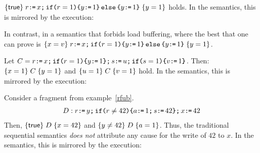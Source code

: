 $\hoare{\TRUE}{r \GETS x \SEMI \IF{r=1} \THEN y \GETS 1 \ELSE y \GETS 1 \FI}{y=1} $ holds.  
In the semantics, this is mirrored by the execution:
\begin{tikzdisplay}[node distance=1em]
\end{tikzdisplay}
In contrast, in a semantics that forbids load buffering, where the best that one can prove is
$\hoare{x=v} {r \GETS x \SEMI \IF{r=1} \THEN y \GETS 1 \ELSE y \GETS 1 \FI}{y= 1}
$.

Let $\aCmd = r \GETS x \SEMI \IF{r=1} \THEN y \GETS 1 \FI \SEMI s \GETS u \SEMI \IF{s=1} \THEN v \GETS 1 \FI$.  Then:
$ \hoare{x=1}{\aCmd}{y=1}$ and
$ \hoare{u=1}{\aCmd}{v=1}$
hold.  In the semantics, this is mirrored by the execution:
\begin{tikzdisplay}[node distance=1em]
\end{tikzdisplay}


Consider a fragment from example~\eqref{rfub}.
\begin{align*}
\bCmd:  r \GETS y \SEMI \IF{r \NOTEQ 42} \THEN a \GETS 1 \SEMI s \GETS 42 \FI \SEMI x \GETS 42
\end{align*}
Then, $\hoare{\TRUE}{\bCmd}{x=42} $ and $\hoare{y \neq 42}{\bCmd}{a= 1} $.  Thus, the traditional sequential semantics {\em does not} attribute any cause for the write of $42$ to $x$.  
In the semantics, this is mirrored by the execution:
\begin{tikzdisplay}[node distance=1em]
\end{tikzdisplay}


\endinput 




